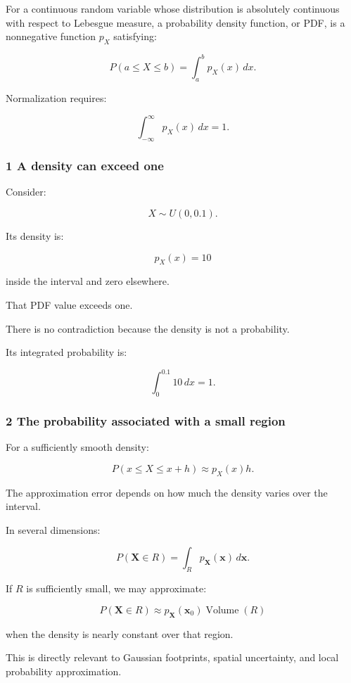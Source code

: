 For a continuous random variable whose distribution is absolutely continuous with respect to Lebesgue measure, a probability density function, or PDF, is a nonnegative function \(p_X\) satisfying:

\[
 \boxed{ P(a\le X\le b) = \int_a^bp_X(x)\,dx }.
\]

Normalization requires:

\[
 \boxed{ \int_{-\infty}^{\infty}p_X(x)\,dx=1 }.
\]

\subsubsection{1 A density can exceed one}\label{02-foundations-ii-ch023-a-density-can-exceed-one}

Consider:

\[
 X\sim U(0,0.1).
\]

Its density is:

\[
 p_X(x)=10
\]

inside the interval and zero elsewhere.

That PDF value exceeds one.

There is no contradiction because the density is not a probability.

Its integrated probability is:

\[
 \int_0^{0.1}10\,dx=1.
\]

\subsubsection{2 The probability associated with a small region}\label{02-foundations-ii-ch023-the-probability-associated-with-a-small-region}

For a sufficiently smooth density:

\[
 P(x\le X\le x+h) \approx p_X(x)h.
\]

The approximation error depends on how much the density varies over the interval.

In several dimensions:

\[
 P(\mathbf X\in R) = \int_Rp_{\mathbf X}(\mathbf x)\,d\mathbf x.
\]

If \(R\) is sufficiently small, we may approximate:

\[
 P(\mathbf X\in R) \approx p_{\mathbf X}(\mathbf x_0)\operatorname{Volume}(R)
\]

when the density is nearly constant over that region.

This is directly relevant to Gaussian footprints, spatial uncertainty, and local probability approximation.

